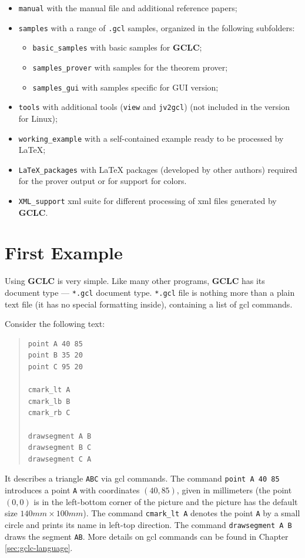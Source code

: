 \documentclass[a4paper]{book}
\newcommand{\gclc}{{\bfseries GCLC}\xspace}
\begin{document}
\begin{itemize}
\item \verb|manual| with the manual file and additional reference papers;
\item \verb|samples| with a range of \verb|.gcl| samples, organized
in the following subfolders:
\begin{itemize}
\item \verb|basic_samples| with basic samples for \gclc;
\item \verb|samples_prover| with samples for the theorem prover;
\item \verb|samples_gui| with samples specific for GUI version;
\end{itemize}
\item \verb|tools| with additional tools (\verb|view| and \verb|jv2gcl|)
(not included in the version for Linux);
\item \verb|working_example| with a self-contained example ready to be
processed by \LaTeX;
\item \verb|LaTeX_packages| with \LaTeX{} packages (developed by other
authors) required for the prover output or for support for colors.
\item \verb|XML_support| {\sc xml} suite for different processing of
{\sc xml} files generated by \gclc.
\end{itemize}



\section{First Example}

Using \gclc is very simple. Like many other programs,
\gclc has its document type --- \verb|*.gcl| document type.
\verb|*.gcl| file is nothing more than a plain text file (it has
no special formatting inside), containing a list of {\sc gcl} commands.

Consider the following text:

\begin{quote}
\begin{verbatim}
point A 40 85
point B 35 20
point C 95 20

cmark_lt A
cmark_lb B
cmark_rb C

drawsegment A B
drawsegment B C
drawsegment C A
\end{verbatim}
\end{quote}

It describes a triangle \verb|ABC| via {\sc gcl} commands. The command
\verb|point A 40 85| introduces a point \verb|A| with coordinates
$(40,85)$, given in millimeters (the point $(0,0)$ is in the left-bottom corner
of the picture and the picture has the default size $140 mm \times 100 mm$). 
The command \verb|cmark_lt A| denotes the point \verb|A|
by a small circle and prints its name in left-top direction.
The command \verb|drawsegment A B| draws the segment \verb|AB|.
More details on {\sc gcl} commands can be found in Chapter
\ref{sec:gclc-language}.
\end{document}
